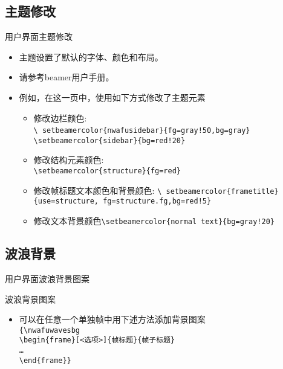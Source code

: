 \documentclass[xcolor=svgnames, t, aspectratio=169]{ctexbeamer}
\begin{document}
\subsection{主题修改}
{
  \begin{frame}{用户界面}{主题修改}
    \begin{itemize}
    \item 主题设置了默认的字体、颜色和布局。
    \item 请参考beamer用户手册。
    \item 例如，在这一页中，使用如下方式修改了主题元素
      \begin{itemize}
      \item 修改边栏颜色:\\
        {\tt \textbackslash
          setbeamercolor\{nwafusidebar\}\{fg=gray!50,bg=gray\}} {\tt
          \textbackslash setbeamercolor\{sidebar\}\{bg=red!20\}}
      \item 修改结构元素颜色:\\
        {\tt \textbackslash setbeamercolor\{structure\}\{fg=red\}}\\
      \item 修改帧标题文本颜色和背景颜色: {\tt \textbackslash
          setbeamercolor\{frametitle\}\{use=structure,
          fg=structure.fg,bg=red!5\}}
      \item 修改文本背景颜色{\tt \textbackslash setbeamercolor\{normal
          text\}\{bg=gray!20\}}
      \end{itemize}
    \end{itemize}
  \end{frame}}

\subsection{波浪背景}
\begin{frame}{用户界面}{波浪背景图案}
  \begin{block}{波浪背景图案}
    \begin{itemize}
    \item 可以在任意一个单独帧中用下述方法添加背景图案\\
      {\tt \{\textbackslash nwafuwavesbg\\
        \textbackslash begin\{frame\}[<选项>]\{帧标题\}\{帧子标题\}\\
        \ldots\\
        \textbackslash end\{frame\}\}}
    \end{itemize}
  \end{block}
\end{frame}
\end{document}

